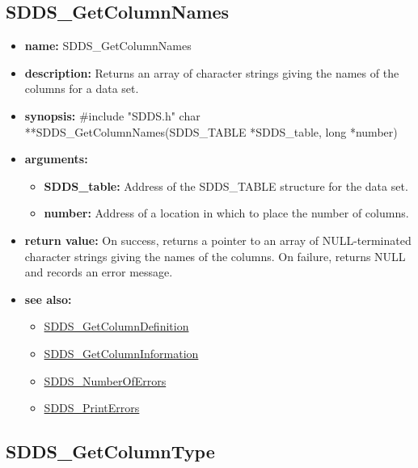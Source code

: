 \documentclass[11pt]{article}
\newcommand{\progref}[1]{\hyperref{SDDS_#1}{{\tt SDDS\_#1} (}{)}{SDDS_#1}}
\begin{document}
\subsection{SDDS\_GetColumnNames}
\label{SDDS_GetColumnNames}

\begin{itemize}
\item {\bf name:}\newline
SDDS\_GetColumnNames
\item {\bf description:}\newline
Returns an array of character strings giving the names of the columns for a data set.
\item {\bf synopsis:} \#include "SDDS.h"\newline
char **SDDS\_GetColumnNames(SDDS\_TABLE *SDDS\_table, long *number)
\item {\bf arguments:}
\begin{itemize}
\item {\bf SDDS\_table:} Address of the SDDS\_TABLE structure for the data set.
\item {\bf number:} Address of a location in which to place the number of columns.
\end{itemize}
\item {\bf return value:}\newline
On success, returns a pointer to an array of NULL-terminated character strings giving the names of the columns. On failure, returns NULL and records an error message.
\item {\bf see also:}
\begin{itemize}
\item \progref{GetColumnDefinition}
\item \progref{GetColumnInformation}
\item \progref{NumberOfErrors}
\item \progref{PrintErrors}
\end{itemize}
\end{itemize}

\subsection{SDDS\_GetColumnType}
\label{SDDS_GetColumnType}
\end{document}

